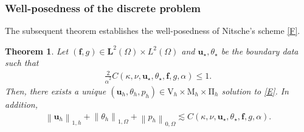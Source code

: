 \documentclass[10pt,a4paper]{article}
\newtheorem{theorem} {\bf Theorem}
\begin{document}
  		\subsubsection{Well-posedness of the discrete problem}
  		The subsequent theorem establishes the well-posedness of Nitsche's scheme \eqref{F}.
  		\begin{theorem}\label{van}
  			Let $(\boldsymbol{f},g) \in \boldsymbol{L}^2(\Omega) \times L^{2}(\Omega)$ and $\boldsymbol{u}_{\star}, \theta_{\star}$ be the boundary data such that
  			\begin{align}\label{55}
  			\frac{2}{\hat{\alpha}^2}C(\kappa, \nu, \boldsymbol{u}_{\star}, \theta_{\star}, \boldsymbol{f}, g, \alpha) \leq 1.
  	    	\end{align}
  			Then, there exists a unique $\left( \boldsymbol{u}_h, \theta_h, p_h\right) \in \mathrm{V}_h \times \mathrm{M}_h \times \mathrm{\Pi}_h$ solution to \eqref{E}. In addition, 
  			\begin{align}\label{qa8}
  			\left\|\boldsymbol{u}_h\right\|_{1,h}+ \left\|\theta_h \right\|_{1,\Omega} + \left\|p_h\right\|_{0,\Omega} \lesssim C(\kappa, \nu, \boldsymbol{u}_{\star}, \theta_{\star}, \boldsymbol{f}, g, \alpha).
  			\end{align}
  		\end{theorem}
\end{document}
